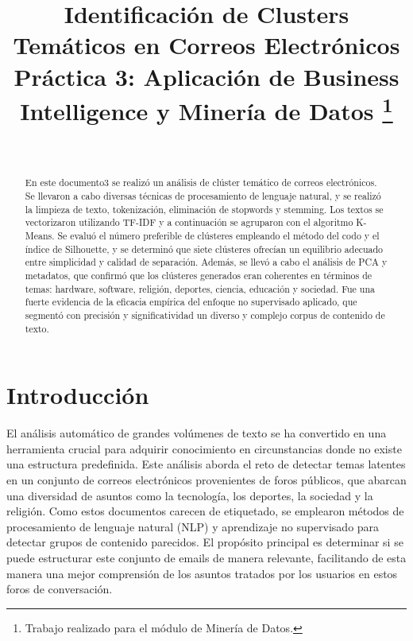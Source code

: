 \documentclass[journal]{IEEEtran}
\begin{document}
\title{Identificación de Clusters Temáticos en Correos Electrónicos\\
{\footnotesize Práctica 3: Aplicación de Business Intelligence y Minería de Datos}
\thanks{Trabajo realizado para el módulo de Minería de Datos.}
}

\author{
    \\
}

\maketitle

\renewcommand{\abstractname}{Resumen}
\begin{abstract}
En este documento3 se realizó un análisis de clúster temático de correos electrónicos. Se llevaron a cabo diversas técnicas de procesamiento de lenguaje natural, y se realizó la limpieza de texto, tokenización, eliminación de stopwords y stemming. Los textos se vectorizaron utilizando TF-IDF y a continuación se agruparon con el algoritmo K-Means. Se evaluó el número preferible de clústeres empleando el método del codo y el índice de Silhouette, y se determinó que siete clústeres ofrecían un equilibrio adecuado entre simplicidad y calidad de separación. Además, se llevó a cabo el análisis de PCA y metadatos, que confirmó que los clústeres generados eran coherentes en términos de temas: hardware, software, religión, deportes, ciencia, educación y sociedad. Fue una fuerte evidencia de la eficacia empírica del enfoque no supervisado aplicado, que segmentó con precisión y significatividad un diverso y complejo corpus de contenido de texto.
\end{abstract}

\section{Introducción}
El análisis automático de grandes volúmenes de texto se ha convertido en una herramienta crucial para adquirir conocimiento en circunstancias donde no existe una estructura predefinida.  Este análisis aborda el reto de detectar temas latentes en un conjunto de correos electrónicos provenientes de foros públicos, que abarcan una diversidad de asuntos como la tecnología, los deportes, la sociedad y la religión.   Como estos documentos carecen de etiquetado, se emplearon métodos de procesamiento de lenguaje natural (NLP) y aprendizaje no supervisado para detectar grupos de contenido parecidos.  El propósito principal es determinar si se puede estructurar este conjunto de emails de manera relevante, facilitando de esta manera una mejor comprensión de los asuntos tratados por los usuarios en estos foros de conversación.
\end{document}
